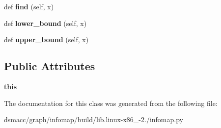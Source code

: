 \begin{DoxyCompactItemize}
\item 
\mbox{\label{classinfomap_1_1StateNodeMap_aad3d94e5516a06050fc3bb1c096109fe}} 
def {\bfseries find} (self, x)
\item 
\mbox{\label{classinfomap_1_1StateNodeMap_a47ed643655b78a619355b3c45a9c31c2}} 
def {\bfseries lower\+\_\+bound} (self, x)
\item 
\mbox{\label{classinfomap_1_1StateNodeMap_ad1c33b3ec8a7a9f5869bbb03d91b252d}} 
def {\bfseries upper\+\_\+bound} (self, x)
\end{DoxyCompactItemize}
\subsection*{Public Attributes}
\begin{DoxyCompactItemize}
\item 
\mbox{\label{classinfomap_1_1StateNodeMap_ab04f997278afc123cf3ef76900a8ae0a}} 
{\bfseries this}
\end{DoxyCompactItemize}


The documentation for this class was generated from the following file\+:\begin{DoxyCompactItemize}
\item 
dsmacc/graph/infomap/build/lib.\+linux-\/x86\+\_-\/2./infomap.\+py\end{DoxyCompactItemize}
